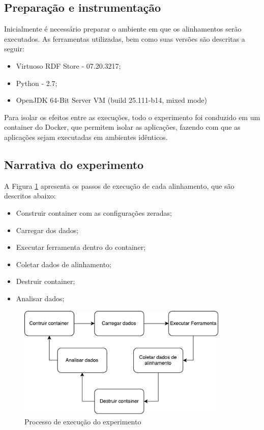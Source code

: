 \subsection{Preparação e instrumentação}
Inicialmente é necessário preparar o ambiente em que os alinhamentos serão executados. As ferramentas utilizadas, bem como suas versões são descritas a seguir:

\begin{itemize}
\item Virtuoso RDF Store - 07.20.3217;
\item Python - 2.7;
\item OpenJDK 64-Bit Server VM (build 25.111-b14, mixed mode)

\end{itemize}

Para isolar os efeitos entre as execuções, todo o experimento foi conduzido em um container do Docker, que permitem isolar as aplicações, fazendo com que as aplicações sejam executadas em ambientes idênticos.

\subsection{Narrativa do experimento}
A Figura \ref{fig:experiment} apresenta os passos de execução de cada alinhamento, que são descritos abaixo:
\begin{itemize}
\item Construir container com as configurações zeradas;
\item Carregar dos dados;
\item Executar ferramenta dentro do container;
\item Coletar dados de alinhamento;
\item Destruir container;
\item Analisar dados;
\end{itemize}

\begin{figure}[h]
	\centering
	\includegraphics[width=0.9\textwidth]{./imagens/experimento.pdf}
    \caption{Processo de execução do experimento}
	\label{fig:experiment}
\end{figure}

